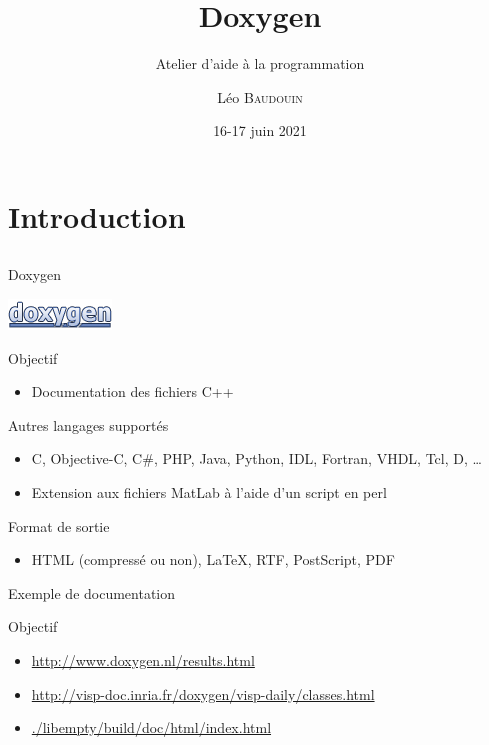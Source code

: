 \documentclass{beamer}
\title{Doxygen}
\subtitle{Atelier d'aide à la programmation}
\author{L\'eo \textsc{Baudouin}}
\institute{
  {\url{baudouin.leo @ gmail.com}}
}
\date{16-17 juin 2021}
\begin{document}
\begin{frame}
  \titlepage
\end{frame}

\section{Introduction}
\subsection{}

\begin{frame}{Doxygen}

\begin{center}
\includegraphics[width=0.3\linewidth]{images/doxygen-logo}
\end{center}

\begin{exampleblock}{Objectif}
\begin{itemize}
\item Documentation des fichiers C++
\end{itemize}
\end{exampleblock}

\begin{block}{Autres langages supportés}
\begin{itemize}
\item C, Objective-C, C\#, PHP, Java, Python, IDL, Fortran, VHDL, Tcl, D, \dots
\item Extension aux fichiers MatLab à l'aide d'un script en perl
\end{itemize}
\end{block}

\begin{block}{Format de sortie}
\begin{itemize}
\item HTML (compressé ou non), \LaTeX, RTF, PostScript, PDF
\end{itemize}
\end{block}
\end{frame}


\begin{frame}{Exemple de documentation}
\begin{block}{Objectif}
\begin{itemize}
\item \url{http://www.doxygen.nl/results.html}
\item \url{http://visp-doc.inria.fr/doxygen/visp-daily/classes.html}
\item \url{./libempty/build/doc/html/index.html}
\end{itemize}
\end{block}
\end{frame}
\end{document}
